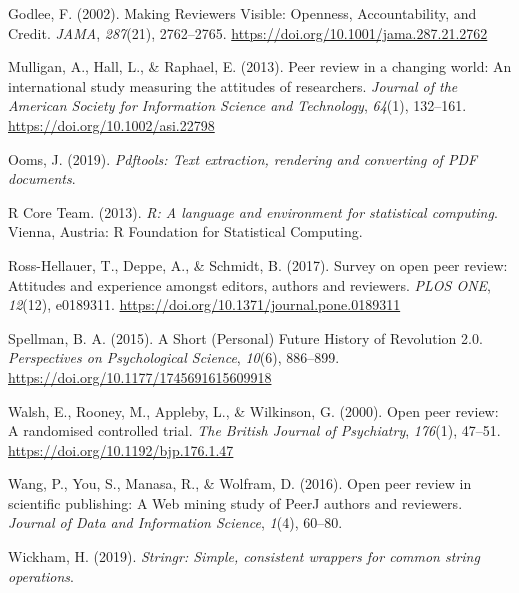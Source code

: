 \documentclass[
  english,
  ,jou, a4paper,floatsintext]{apa6}
\begin{document}
\leavevmode\hypertarget{ref-godlee_making_2002}{}%
Godlee, F. (2002). Making Reviewers Visible: Openness, Accountability, and Credit. \emph{JAMA}, \emph{287}(21), 2762--2765. \url{https://doi.org/10.1001/jama.287.21.2762}

\leavevmode\hypertarget{ref-mulligan_peer_2013}{}%
Mulligan, A., Hall, L., \& Raphael, E. (2013). Peer review in a changing world: An international study measuring the attitudes of researchers. \emph{Journal of the American Society for Information Science and Technology}, \emph{64}(1), 132--161. \url{https://doi.org/10.1002/asi.22798}

\leavevmode\hypertarget{ref-ooms_pdftools_2019}{}%
Ooms, J. (2019). \emph{Pdftools: Text extraction, rendering and converting of PDF documents}.

\leavevmode\hypertarget{ref-r_core_team_r_2013}{}%
R Core Team. (2013). \emph{R: A language and environment for statistical computing}. Vienna, Austria: R Foundation for Statistical Computing.

\leavevmode\hypertarget{ref-ross-hellauer_survey_2017}{}%
Ross-Hellauer, T., Deppe, A., \& Schmidt, B. (2017). Survey on open peer review: Attitudes and experience amongst editors, authors and reviewers. \emph{PLOS ONE}, \emph{12}(12), e0189311. \url{https://doi.org/10.1371/journal.pone.0189311}

\leavevmode\hypertarget{ref-spellman_short_2015}{}%
Spellman, B. A. (2015). A Short (Personal) Future History of Revolution 2.0. \emph{Perspectives on Psychological Science}, \emph{10}(6), 886--899. \url{https://doi.org/10.1177/1745691615609918}

\leavevmode\hypertarget{ref-walsh_open_2000}{}%
Walsh, E., Rooney, M., Appleby, L., \& Wilkinson, G. (2000). Open peer review: A randomised controlled trial. \emph{The British Journal of Psychiatry}, \emph{176}(1), 47--51. \url{https://doi.org/10.1192/bjp.176.1.47}

\leavevmode\hypertarget{ref-wang_open_2016}{}%
Wang, P., You, S., Manasa, R., \& Wolfram, D. (2016). Open peer review in scientific publishing: A Web mining study of PeerJ authors and reviewers. \emph{Journal of Data and Information Science}, \emph{1}(4), 60--80.

\leavevmode\hypertarget{ref-wickham_stringr_2019}{}%
Wickham, H. (2019). \emph{Stringr: Simple, consistent wrappers for common string operations}.
\end{document}
